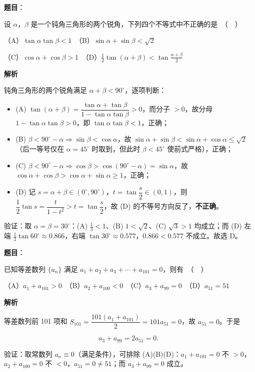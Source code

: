 \begin{answer}

\textbf{题目}：

设 $\alpha$，$\beta$ 是一个钝角三角形的两个锐角，下列四个不等式中不正确的是　（　）

（A）$\tan\alpha\tan\beta < 1$　（B）$\sin\alpha + \sin\beta < \sqrt{2}$

（C）$\cos\alpha + \cos\beta > 1$　（D）$\frac{1}{2}\tan(\alpha+\beta) < \tan\frac{\alpha+\beta}{2}$

\textbf{解析}

钝角三角形的两个锐角满足 $\alpha+\beta<90^\circ$，逐项判断：

\begin{itemize}
\item (A) $\tan(\alpha+\beta)=\dfrac{\tan\alpha+\tan\beta}{1-\tan\alpha\tan\beta}>0$，而分子 $>0$，故分母 $1-\tan\alpha\tan\beta>0$，即 $\tan\alpha\tan\beta<1$，正确；
\item (B) $\beta<90^\circ-\alpha\Rightarrow\sin\beta<\cos\alpha$，故 $\sin\alpha+\sin\beta<\sin\alpha+\cos\alpha\le\sqrt2$（后一等号仅在 $\alpha=45^\circ$ 时取到，但此时 $\beta<45^\circ$ 使前式严格），正确；
\item (C) $\beta<90^\circ-\alpha\Rightarrow\cos\beta>\cos(90^\circ-\alpha)=\sin\alpha$，故 $\cos\alpha+\cos\beta>\cos\alpha+\sin\alpha\ge1$，正确；
\item (D) 记 $s=\alpha+\beta\in(0^\circ,90^\circ)$，$t=\tan\dfrac s2\in(0,1)$，则 $\dfrac12\tan s=\dfrac{t}{1-t^2}>t=\tan\dfrac s2$，故 (D) 的不等号方向反了，\textbf{不正确}。
\end{itemize}

验证：取 $\alpha=\beta=30^\circ$：(A) $\tfrac13<1$、(B) $1<\sqrt2$、(C) $\sqrt3>1$ 均成立；而 (D) 左端 $\tfrac12\tan60^\circ\approx0.866$，右端 $\tan30^\circ\approx0.577$，$0.866<0.577$ 不成立。故选 D。


\par\medskip

\end{answer}
\begin{answer}

\textbf{题目}：

已知等差数列 $\{a_n\}$ 满足 $a_1 + a_2 + a_3 + \cdots + a_{101} = 0$，则有　（　）

（A）$a_1 + a_{101} > 0$　（B）$a_2 + a_{100} < 0$　（C）$a_3 + a_{99} = 0$　（D）$a_{51} = 51$

\textbf{解析}

等差数列前 101 项和 $S_{101}=\dfrac{101(a_1+a_{101})}{2}=101a_{51}=0$，故 $a_{51}=0$。于是

\nopagebreak[4]
\[a_3+a_{99}=2a_{51}=0 .\]

验证：取常数列 $a_n\equiv0$（满足条件），可排除 (A)(B)(D)：$a_1+a_{101}=0$ 不 $>0$，$a_2+a_{100}=0$ 不 $<0$，$a_{51}=0\ne51$；而 $a_3+a_{99}=0$ 成立。


\par\medskip

\end{answer}
